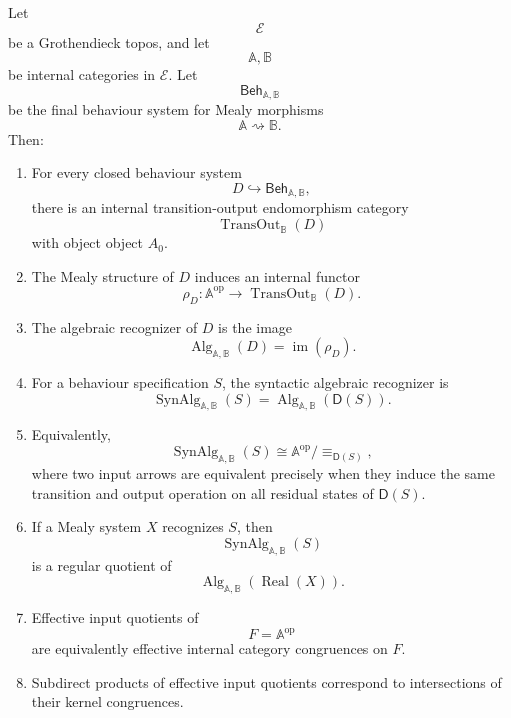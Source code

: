 \begin{theorem}
\label{thm:reiterman-main-consolidation}
Let
\[
\mathcal E
\]
be a Grothendieck topos, and let
\[
\mathbb A,\mathbb B
\]
be internal categories in \(\mathcal E\). Let
\[
\mathsf{Beh}_{\mathbb A,\mathbb B}
\]
be the final behaviour system for Mealy morphisms
\[
\mathbb A\rightsquigarrow\mathbb B.
\]
Then:

\begin{enumerate}
\item For every closed behaviour system
\[
D\hookrightarrow\mathsf{Beh}_{\mathbb A,\mathbb B},
\]
there is an internal transition-output endomorphism category
\[
\operatorname{TransOut}_{\mathbb B}(D)
\]
with object object \(A_0\).

\item The Mealy structure of \(D\) induces an internal functor
\[
\rho_D:
\mathbb A^{\mathrm{op}}
\to
\operatorname{TransOut}_{\mathbb B}(D).
\]

\item The algebraic recognizer of \(D\) is the image
\[
\operatorname{Alg}_{\mathbb A,\mathbb B}(D)
=
\operatorname{im}(\rho_D).
\]

\item For a behaviour specification \(S\), the syntactic algebraic recognizer
is
\[
\operatorname{SynAlg}_{\mathbb A,\mathbb B}(S)
=
\operatorname{Alg}_{\mathbb A,\mathbb B}(\mathsf D(S)).
\]

\item Equivalently,
\[
\operatorname{SynAlg}_{\mathbb A,\mathbb B}(S)
\cong
\mathbb A^{\mathrm{op}}/{\equiv_{\mathsf D(S)}},
\]
where two input arrows are equivalent precisely when they induce the same
transition and output operation on all residual states of \(\mathsf D(S)\).

\item If a Mealy system \(X\) recognizes \(S\), then
\[
\operatorname{SynAlg}_{\mathbb A,\mathbb B}(S)
\]
is a regular quotient of
\[
\operatorname{Alg}_{\mathbb A,\mathbb B}(\operatorname{Real}(X)).
\]

\item Effective input quotients of
\[
F=\mathbb A^{\mathrm{op}}
\]
are equivalently effective internal category congruences on \(F\).

\item Subdirect products of effective input quotients correspond to
intersections of their kernel congruences.


\end{enumerate}
\end{theorem}
